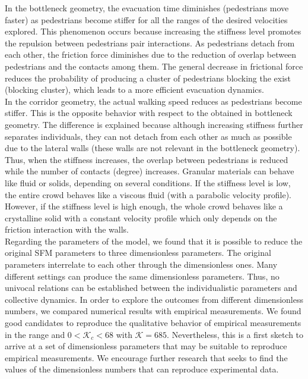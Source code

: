 \documentclass[preprint,12pt]{elsarticle}
\begin{document}
In the bottleneck geometry, the evacuation time diminishes (pedestrians move faster) as pedestrians become stiffer for all the ranges of the desired velocities explored. This phenomenon occurs because increasing the stiffness level promotes the repulsion between pedestrians pair interactions. As pedestrians detach from each other, the friction force diminishes due to the reduction of overlap between pedestrians and the contacts among them. The general decrease in frictional force reduces the probability of producing a cluster of pedestrians blocking the exist (blocking cluster), which leads to a more efficient evacuation dynamics. \\

In the corridor geometry, the actual walking speed reduces as pedestrians become stiffer. This is the opposite behavior with respect to the obtained in bottleneck geometry. The difference is explained because although increasing stiffness further separates individuals, they can not detach from each other as much as possible due to the lateral walls (these walls are not relevant in the bottleneck geometry). Thus, when the stiffness increases, the overlap between pedestrians is reduced while the number of contacts (degree) increases. Granular materials can behave like fluid or solids, depending on several conditions. If the stiffness level is low, the entire crowd behaves like a viscous fluid (with a parabolic velocity profile). However, if the stiffness level is high enough, the whole crowd behaves like a crystalline solid with a constant velocity profile which only depends on the friction interaction with the walls.\\

Regarding the parameters of the model, we found that it is possible to reduce the original SFM parameters to three dimensionless parameters. The original parameters interrelate to each other through the dimensionless ones. Many different settings can produce the same dimensionless parameters. Thus, no univocal relations can be established between the individualistic parameters and collective dynamics. In order to explore the outcomes from different dimensionless numbers, we compared numerical results with empirical measurements. We found good candidates to reproduce the qualitative behavior of empirical measurements in the range and $0 < \mathcal{K}_c < 68$ with $\mathcal{K} = 685$. Nevertheless, this is a first sketch to arrive at a set of dimensionless parameters that may be suitable to reproduce empirical measurements. We encourage further research that seeks to find the values of the dimensionless numbers that can reproduce experimental data.\\
\end{document}

